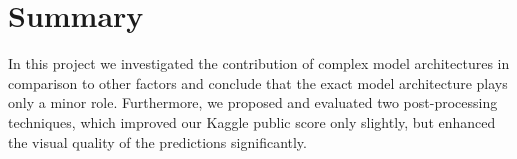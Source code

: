 
\section{Summary}

In this project we investigated the contribution of complex model architectures in comparison to other factors and conclude that the exact model architecture plays only a minor role.
Furthermore, we proposed and evaluated two post-processing techniques, which improved our Kaggle public score only slightly, but enhanced the visual quality of the predictions significantly.

\newpage